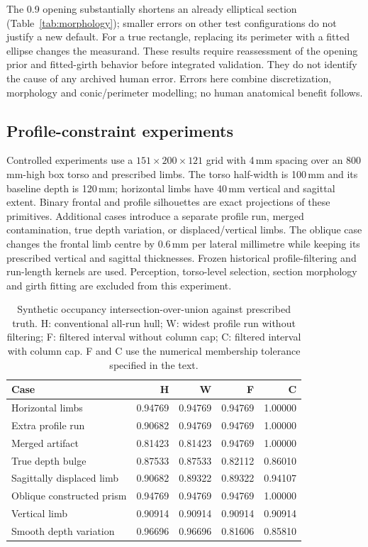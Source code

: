 \documentclass[11pt,a4paper]{article}
\begin{document}
The 0.9 opening substantially shortens an already elliptical section (Table~\ref{tab:morphology}); smaller errors on other test configurations do not justify a new default. For a true rectangle, replacing its perimeter with a fitted ellipse changes the measurand. These results require reassessment of the opening prior and fitted-girth behavior before integrated validation. They do not identify the cause of any archived human error. Errors here combine discretization, morphology and conic/perimeter modelling; no human anatomical benefit follows.

\subsection{Profile-constraint experiments}
Controlled experiments use a $151\times200\times121$ grid with 4\,mm spacing over an 800\,mm-high box torso and prescribed limbs. The torso half-width is 100\,mm and its baseline depth is 120\,mm; horizontal limbs have 40\,mm vertical and sagittal extent. Binary frontal and profile silhouettes are exact projections of these primitives. Additional cases introduce a separate profile run, merged contamination, true depth variation, or displaced/vertical limbs. The oblique case changes the frontal limb centre by 0.6\,mm per lateral millimetre while keeping its prescribed vertical and sagittal thicknesses. Frozen historical profile-filtering and run-length kernels are used. Perception, torso-level selection, section morphology and girth fitting are excluded from this experiment.

\begin{table}[htbp]
\centering
\caption{Synthetic occupancy intersection-over-union against prescribed truth. H: conventional all-run hull; W: widest profile run without filtering; F: filtered interval without column cap; C: filtered interval with column cap. F and C use the numerical membership tolerance specified in the text.}
\label{tab:synthetic}
\small
\begin{tabular}{lrrrr}
\toprule
Case & H & W & F & C\\
\midrule
Horizontal limbs &0.94769&0.94769&0.94769&1.00000\\
Extra profile run &0.90682&0.94769&0.94769&1.00000\\
Merged artifact &0.81423&0.81423&0.94769&1.00000\\
True depth bulge &0.87533&0.87533&0.82112&0.86010\\
Sagittally displaced limb &0.90682&0.89322&0.89322&0.94107\\
Oblique constructed prism &0.94769&0.94769&0.94769&1.00000\\
Vertical limb &0.90914&0.90914&0.90914&0.90914\\
Smooth depth variation &0.96696&0.96696&0.81606&0.85810\\
\bottomrule
\end{tabular}
\end{table}
\end{document}
